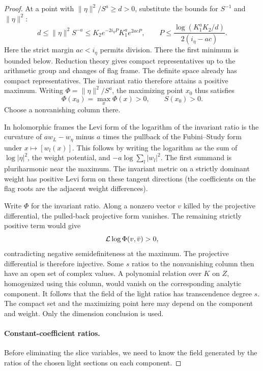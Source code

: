 \begin{proof}
At a point with \(\|\eta\|^2/S^a\ge d>0\), substitute the bounds for
\(S^{-1}\) and \(\|\eta\|^2\):
\[
 d\le \|\eta\|^2S^{-a}\le K_2 e^{-2i_\eta P}K_1^ae^{2acP},
 \qquad
 P\le\frac{\log(K_1^aK_2/d)}{2(i_\eta-ac)} .
\]
Here the strict margin \(ac<i_\eta\) permits division.
There the first minimum is bounded below. Reduction theory gives
compact representatives up to the arithmetic group and changes
of flag frame. The definite space already has compact representatives.
The invariant ratio therefore attains a positive maximum.
Writing \(\Phi=\|\eta\|^2/S^a\), the maximizing point \(x_0\) thus satisfies
\[
  \Phi(x_0)=\max_x\Phi(x)>0,\qquad S(x_0)>0 .
\]
 Choose a
nonvanishing column there.

In holomorphic frames the Levi form of
the logarithm of the invariant ratio is the curvature of
\(a w_L-w_\eta\) minus \(a\) times the pullback of the
Fubini--Study form under \(x\mapsto[w_l(x)]\). This follows by
writing the logarithm as the sum of \(\log|\eta|^2\), the weight
potential, and \(-a\log\sum_l|w_l|^2\). The first summand is
pluriharmonic near the maximum. The invariant metric on a strictly
dominant weight has positive Levi form on these tangent directions
(the coefficients on the flag roots are the adjacent weight
differences).

Write \(\Phi\) for the invariant ratio. Along a nonzero vector \(v\) killed by the projective differential, the pulled-back projective form vanishes. The remaining strictly positive term would give
\[
  {\cal L}\log\Phi(v,\bar v)>0,
\]
contradicting negative semidefiniteness at the maximum. The projective differential is therefore injective. Some \(s\) ratios
to the nonvanishing column then have an open set of complex values.
A polynomial relation over \(K\) on \(Z\), homogenized using this
column, would vanish on the corresponding analytic component.
It follows that the field of the light ratios has transcendence
degree \(s\). The compact set and the maximizing point here may
depend on the component and weight. Only the dimension conclusion
is used.

\paragraph{Constant-coefficient ratios.}

Before eliminating the slice variables, we need to know the field generated by the ratios of the chosen light sections on each component.


\end{proof}
